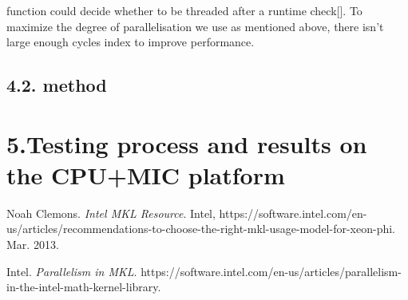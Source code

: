 \documentclass{article}
\begin{document}
\noindent{} function could decide whether to be threaded after a runtime check[]. To maximize the degree of parallelisation we use 
as mentioned above, there isn't large enough cycles index to improve performance.%

\subsection{4.2.\hspace*{0.5em} method}\label{sec-mpi-method}%

\section{5.\hspace*{0.5em}Testing process and results on the CPU+MIC platform}\label{sec-testing-process-and-results-on-the-cpumic-platform}%

{%
\begin{thebibliography}{2}%
\label{sec-bibliography}%

Noah Clemons. \emph{Intel MKL Resource}. Intel, https://software.intel.com/en-us/articles/recommendations-to-choose-the-right-mkl-usage-model-for-xeon-phi. Mar. 2013.\label{mkl-mic}%

Intel. \emph{Parallelism in MKL}. https://software.intel.com/en-us/articles/parallelism-in-the-intel-math-kernel-library.\label{paramkl}%
\par%
\end{thebibliography}}%
\end{document}
